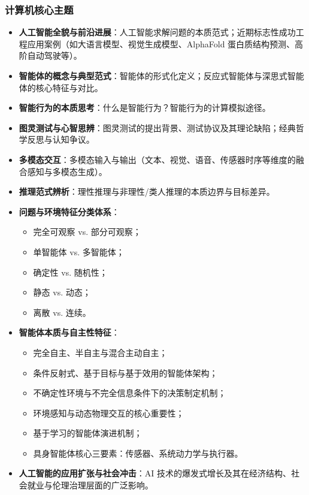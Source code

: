 \subsubsection{计算机核心主题}
\begin{itemize}
    \item \textbf{人工智能全貌与前沿进展}：人工智能求解问题的本质范式；近期标志性成功工程应用案例（如大语言模型、视觉生成模型、AlphaFold 蛋白质结构预测、高阶自动驾驶等）。
    \item \textbf{智能体的概念与典型范式}：智能体的形式化定义；反应式智能体与深思式智能体的核心特征与对比。
    \item \textbf{智能行为的本质思考}：什么是智能行为？智能行为的计算模拟途径。
    \item \textbf{图灵测试与心智思辨}：图灵测试的提出背景、测试协议及其理论缺陷；经典哲学反思与认知争议。
    \item \textbf{多模态交互}：多模态输入与输出（文本、视觉、语音、传感器时序等维度的融合感知与多模态生成）。
    \item \textbf{推理范式辨析}：理性推理与非理性/类人推理的本质边界与目标差异。
    \item \textbf{问题与环境特征分类体系}：
    \begin{itemize}
        \item 完全可观察 vs. 部分可观察；
        \item 单智能体 vs. 多智能体；
        \item 确定性 vs. 随机性；
        \item 静态 vs. 动态；
        \item 离散 vs. 连续。
    \end{itemize}
    \item \textbf{智能体本质与自主性特征}：
    \begin{itemize}
        \item 完全自主、半自主与混合主动自主；
        \item 条件反射式、基于目标与基于效用的智能体架构；
        \item 不确定性环境与不完全信息条件下的决策制定机制；
        \item 环境感知与动态物理交互的核心重要性；
        \item 基于学习的智能体演进机制；
        \item 具身智能体核心三要素：传感器、系统动力学与执行器。
    \end{itemize}
    \item \textbf{人工智能的应用扩张与社会冲击}：AI 技术的爆发式增长及其在经济结构、社会就业与伦理治理层面的广泛影响。
\end{itemize}

